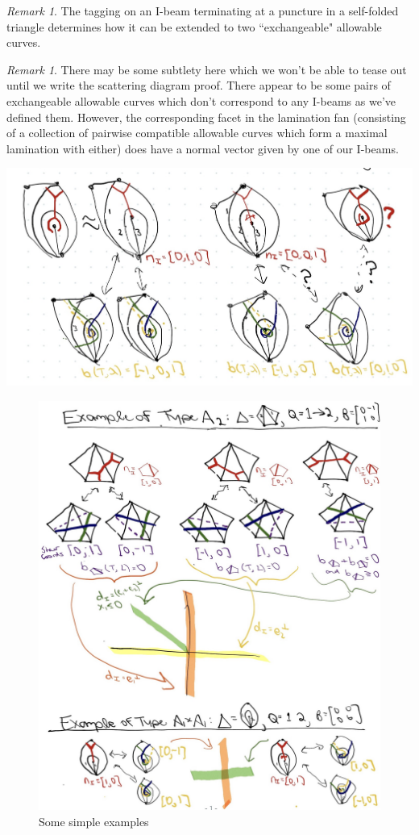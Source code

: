 \documentclass{amsart}
\theoremstyle{definition}
\theoremstyle{remark}
\newtheorem{remark}[proposition]{Remark}
\numberwithin{equation}{section}
\newcommand{\0}{{\mathbf{0}}}
\begin{document}
\begin{remark}
The tagging on an I-beam terminating at a puncture in a self-folded triangle determines how it can be extended to two ``exchangeable" allowable curves. 
\end{remark}

\begin{remark}
There may be some subtlety here which we won't be able to tease out until we write the scattering diagram proof. 
There appear to be some pairs of exchangeable allowable curves which don't correspond to any I-beams as we've defined them. However, the corresponding facet in the lamination fan (consisting of a collection of pairwise compatible allowable curves which form a maximal lamination with either) does have a normal vector given by one of our I-beams.

\includegraphics[scale=.2]{new_ibeam.jpg}
\end{remark}

\begin{figure}
\caption{Some simple examples}
\includegraphics[scale=.25]{ibeam_examples.jpg}
\end{figure}
\end{document}
